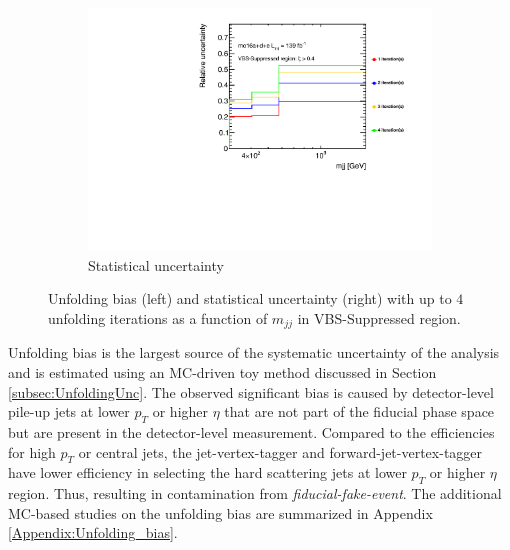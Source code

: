\begin{figure}[htb]
\begin{subfigure}{.49\textwidth}
        \centering
        \includegraphics[width=.95\linewidth]{figures/Analysis/Unfolding/StatUnc_Sup.pdf}
        \caption{ Statistical uncertainty \label{fig:UnfoldingStatUnc}}
    \end{subfigure}
    \caption{ Unfolding bias (left) and statistical uncertainty (right) with up to $4$ unfolding iterations as a function of $m_{jj}$ in VBS-Suppressed region. \label{fig:BiasStatUnc}}
\end{figure}

Unfolding bias is the largest source of the systematic uncertainty of the analysis and is estimated using an MC-driven toy method discussed in Section \ref{subsec:UnfoldingUnc}. The observed significant bias is caused by detector-level pile-up jets at lower $p_{T}$ or higher $\eta$ that are not part of the fiducial phase space but are present in the detector-level measurement. Compared to the efficiencies for high $p_{T}$ or central jets, the jet-vertex-tagger and forward-jet-vertex-tagger have lower efficiency in selecting the hard scattering jets at lower $p_{T}$ or higher $\eta$ region. Thus, resulting in contamination from \textit{fiducial-fake-event}. The additional MC-based studies on the unfolding bias are summarized in Appendix \ref{Appendix:Unfolding_bias}. 
